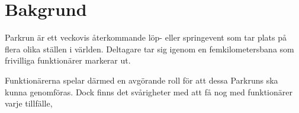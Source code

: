\section{Bakgrund}
Parkrun är ett veckovis återkommande löp- eller springevent som tar plats på flera olika ställen i världen. Deltagare tar sig igenom en femkilometersbana som frivilliga funktionärer markerar ut.

Funktionärerna spelar därmed en avgörande roll för att dessa Parkruns ska kunna genomföras. Dock finns det svårigheter med att få nog med funktionärer varje tillfälle, 
